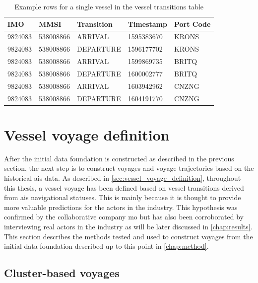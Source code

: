 \begin{table}[htbp]
    \centering
    \begin{tabular}{p{0.7in} p{0.9in} p{1in} p{1in} p{0.65in}}
    \hline
    \bfseries{IMO} & \bfseries{MMSI} & \bfseries{Transition} & \bfseries{Timestamp} & \bfseries{Port Code} \\ \hline
        9824083 & 538008866 & ARRIVAL   & 1595383670 & KRONS \\ \hline
        9824083 & 538008866 & DEPARTURE & 1596177702 & KRONS \\ \hline
        9824083 & 538008866 & ARRIVAL   & 1599869735 & BRITQ \\ \hline
        9824083 & 538008866 & DEPARTURE & 1600002777 & BRITQ \\ \hline
        9824083 & 538008866 & ARRIVAL   & 1603942962 & CNZNG \\ \hline
        9824083 & 538008866 & DEPARTURE & 1604191770 & CNZNG \\ \hline
    \end{tabular}
\caption{Example rows for a single vessel in the vessel transitions table}
\label{tab:vessel_transitions_example}
\end{table}

\section{Vessel voyage definition}

After the initial data foundation is constructed as described in the previous section, the next step is to construct voyages and voyage trajectories based on the historical \acrshort{ais} data. As described in \cref{sec:vessel_voyage_definition}, throughout this thesis, a vessel voyage has been defined based on vessel transitions derived from \acrshort{ais} navigational statuses. This is mainly because it is thought to provide more valuable predictions for the actors in the industry. This hypothesis was confirmed by the collaborative company \acrfull{mo} but has also been corroborated by interviewing real actors in the industry as will be later discussed in \cref{chap:results}. This section describes the methods tested and used to construct voyages from the initial data foundation described up to this point in \cref{chap:method}.

\subsection{Cluster-based voyages}


